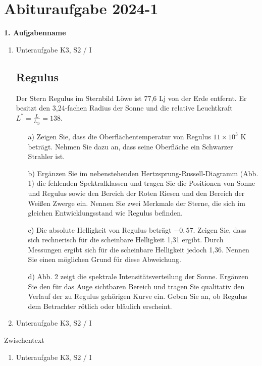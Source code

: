 \chapter{Abituraufgabe 2024-1}\label{Denk}

\begin{aufgabe}
	\textbf{1. Aufgabenname}
	\begin{enumerate}
		\item Unteraufgabe \hfill K3, S2 / I
  \section*{Regulus}

Der Stern Regulus im Sternbild Löwe ist 77,6 Lj von der Erde entfernt. Er besitzt den 3,24-fachen Radius der Sonne und die relative Leuchtkraft $L^* = \frac{L}{L_\odot} = 138$.

\begin{enumerate}
    \item[a)] Zeigen Sie, dass die Oberflächentemperatur von Regulus $11 \times 10^3$ K beträgt. Nehmen Sie dazu an, dass seine Oberfläche ein Schwarzer Strahler ist.

    \item[b)] Ergänzen Sie im nebenstehenden Hertzsprung-Russell-Diagramm (Abb. 1) die fehlenden Spektralklassen und tragen Sie die Positionen von Sonne und Regulus sowie den Bereich der Roten Riesen und den Bereich der Weißen Zwerge ein. Nennen Sie zwei Merkmale der Sterne, die sich im gleichen Entwicklungsstand wie Regulus befinden.

    \item[c)] Die absolute Helligkeit von Regulus beträgt $-0,57$. Zeigen Sie, dass sich rechnerisch für die scheinbare Helligkeit 1,31 ergibt. Durch Messungen ergibt sich für die scheinbare Helligkeit jedoch 1,36. Nennen Sie einen möglichen Grund für diese Abweichung.

    \item[d)] Abb. 2 zeigt die spektrale Intensitätsverteilung der Sonne. Ergänzen Sie den für das Auge sichtbaren Bereich und tragen Sie qualitativ den Verlauf der zu Regulus gehörigen Kurve ein. Geben Sie an, ob Regulus dem Betrachter rötlich oder bläulich erscheint.
\end{enumerate}
		\item Unteraufgabe \hfill K3, S2 / I
	\end{enumerate}
	Zwischentext
	\begin{enumerate}[resume]
		\item Unteraufgabe \hfill K3, S2 / I

\end{enumerate}
\end{aufgabe}
